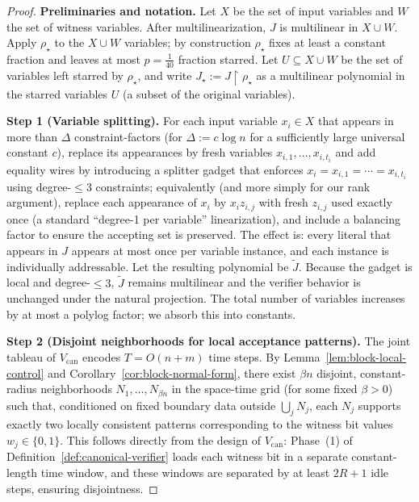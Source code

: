 \documentclass[12pt]{article}
\theoremstyle{definition}
\theoremstyle{definition}
\theoremstyle{remark}
\theoremstyle{remark}
\begin{document}
\begin{proof}
\textbf{Preliminaries and notation.}
Let $X$ be the set of input variables and $W$ the set of witness variables. After multilinearization, $J$ is multilinear in $X\cup W$. Apply $\rho_\star$ to the $X\cup W$ variables; by construction $\rho_\star$ fixes at least a constant fraction and leaves at most $p=\frac{1}{40}$ fraction starred. Let $U\subseteq X\cup W$ be the set of variables left starred by $\rho_\star$, and write $J_\star:=J\upharpoonright\rho_\star$ as a multilinear polynomial in the starred variables $U$ (a subset of the original variables).

\textbf{Step 1 (Variable splitting).}
For each input variable $x_i\in X$ that appears in more than $\Delta$ constraint-factors (for $\Delta:=c\log n$ for a sufficiently large universal constant $c$), replace its appearances by fresh variables $x_{i,1},\ldots,x_{i,t_i}$ and add equality wires by introducing a splitter gadget that enforces $x_i=x_{i,1}=\cdots=x_{i,t_i}$ using degree-$\le 3$ constraints; equivalently (and more simply for our rank argument), replace each appearance of $x_i$ by $x_i z_{i,j}$ with fresh $z_{i,j}$ used exactly once (a standard ``degree-1 per variable'' linearization), and include a balancing factor to ensure the accepting set is preserved. The effect is: every literal that appears in $J$ appears at most once per variable instance, and each instance is individually addressable. Let the resulting polynomial be $\tilde{J}$. Because the gadget is local and degree-$\le 3$, $\tilde{J}$ remains multilinear and the verifier behavior is unchanged under the natural projection. The total number of variables increases by at most a polylog factor; we absorb this into constants.

\textbf{Step 2 (Disjoint neighborhoods for local acceptance patterns).}
The joint tableau of $V_{\mathrm{can}}$ encodes $T=O(n+m)$ time steps. By Lemma~\ref{lem:block-local-control} and Corollary~\ref{cor:block-normal-form}, there exist $\beta n$ disjoint, constant-radius neighborhoods $N_1,\ldots,N_{\beta n}$ in the space-time grid (for some fixed $\beta>0$) such that, conditioned on fixed boundary data outside $\bigcup_j N_j$, each $N_j$ supports exactly two locally consistent patterns corresponding to the witness bit values $w_j\in\{0,1\}$. This follows directly from the design of $V_{\mathrm{can}}$: Phase~(1) of Definition~\ref{def:canonical-verifier} loads each witness bit in a separate constant-length time window, and these windows are separated by at least $2R+1$ idle steps, ensuring disjointness.


\end{proof}
\end{document}
